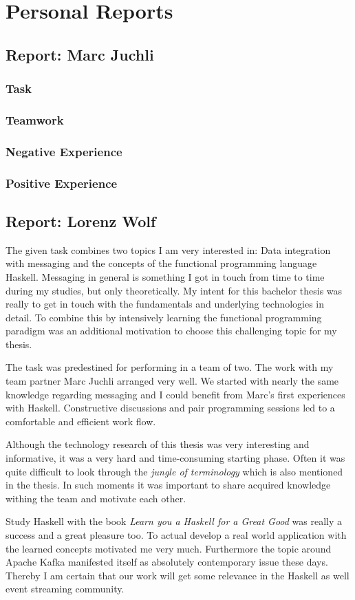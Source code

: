 \chapter{Personal Reports}

\section*{Report: Marc Juchli}

\subsection*{Task}
\subsection*{Teamwork}
\subsection*{Negative Experience}
\subsection*{Positive Experience}


\section*{Report: Lorenz Wolf}
The given task combines two topics I am very interested in: Data integration
with messaging and the concepts of the functional programming language Haskell.
Messaging in general is something I got in touch from time to time during my
studies, but only theoretically. My intent for this bachelor thesis was really to
get in touch with the fundamentals and underlying technologies in detail. To
combine this by intensively learning the functional programming paradigm was an
additional motivation to choose this challenging topic for my thesis.

The task was predestined for performing in a team of two. The work with my team
partner Marc Juchli arranged very well. We started with nearly the same
knowledge regarding messaging and I could benefit from Marc's first experiences
with Haskell. Constructive discussions and pair programming sessions led to a
comfortable and efficient work flow.

Although the technology research of this thesis was very interesting and
informative, it was a very hard and time-consuming starting phase. Often it was
quite difficult to look through the \textit{jungle of terminology} which is also
mentioned in the thesis. In such moments it was important to share acquired
knowledge withing the team and motivate each other.

Study Haskell with the book \textit{Learn you a Haskell for a Great Good} was
really a success and a great pleasure too. To actual develop a real world
application with the learned concepts motivated me very much. Furthermore
the topic around Apache Kafka manifested itself as absolutely contemporary issue
these days. Thereby I am certain that our work will get some relevance in
the Haskell as well event streaming community.



